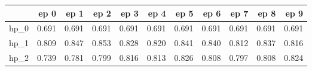 \begin{tabular}{lrrrrrrrrrr}
\toprule
{} &   ep 0 &   ep 1 &   ep 2 &   ep 3 &   ep 4 &   ep 5 &   ep 6 &   ep 7 &   ep 8 &   ep 9 \\
\midrule
hp\_0 &  0.691 &  0.691 &  0.691 &  0.691 &  0.691 &  0.691 &  0.691 &  0.691 &  0.691 &  0.691 \\
hp\_1 &  0.809 &  0.847 &  0.853 &  0.828 &  0.820 &  0.841 &  0.840 &  0.812 &  0.837 &  0.816 \\
hp\_2 &  0.739 &  0.781 &  0.799 &  0.816 &  0.813 &  0.826 &  0.808 &  0.797 &  0.808 &  0.824 \\
\bottomrule
\end{tabular}

